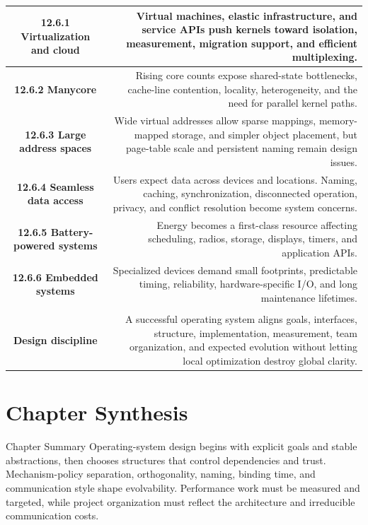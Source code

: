 \documentclass[10pt,letterpaper]{article}
\begin{document}
\begin{longtable}{C N}
\textbf{12.6.1 Virtualization and cloud} & Virtual machines, elastic infrastructure, and service APIs push kernels toward isolation, measurement, migration support, and efficient multiplexing.\\\hline
\textbf{12.6.2 Manycore} & Rising core counts expose shared-state bottlenecks, cache-line contention, locality, heterogeneity, and the need for parallel kernel paths.\\\hline
\textbf{12.6.3 Large address spaces} & Wide virtual addresses allow sparse mappings, memory-mapped storage, and simpler object placement, but page-table scale and persistent naming remain design issues.\\\hline
\textbf{12.6.4 Seamless data access} & Users expect data across devices and locations. Naming, caching, synchronization, disconnected operation, privacy, and conflict resolution become system concerns.\\\hline
\textbf{12.6.5 Battery-powered systems} & Energy becomes a first-class resource affecting scheduling, radios, storage, displays, timers, and application APIs.\\\hline
\textbf{12.6.6 Embedded systems} & Specialized devices demand small footprints, predictable timing, reliability, hardware-specific I/O, and long maintenance lifetimes.\\\hline
{}\\*\hline
\textbf{Design discipline} & A successful operating system aligns goals, interfaces, structure, implementation, measurement, team organization, and expected evolution without letting local optimization destroy global clarity.\\\hline
\end{longtable}
\normalsize

\section*{Chapter Synthesis}
\begin{studybox}{Chapter Summary}
Operating-system design begins with explicit goals and stable abstractions, then chooses structures that control dependencies and trust. Mechanism-policy separation, orthogonality, naming, binding time, and communication style shape evolvability. Performance work must be measured and targeted, while project organization must reflect the architecture and irreducible communication costs.
\end{studybox}
\end{document}
